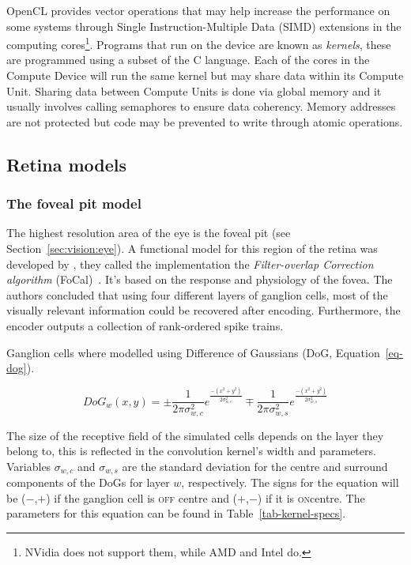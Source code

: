 OpenCL provides vector operations that may help increase the performance on some systems through Single Instruction-Multiple Data (SIMD) extensions in the computing cores\footnote{NVidia does not support them, while AMD and Intel do.}. Programs that run on the device are known as \emph{kernels}, these are programmed using a subset of the C language. Each of the cores in the Compute Device will run the same kernel but may share data within its Compute Unit. Sharing data between Compute Units is done via global memory and it usually involves calling semaphores to ensure data coherency. Memory addresses are not protected but code may be prevented to write through atomic operations.

\subsection{Retina models}
\subsubsection{The foveal pit model}

The highest resolution area of the eye is the foveal pit (see Section~\ref{sec:vision:eye}). A functional model for this region of the retina was developed by \citeauthor{basab-model}, they called the implementation the \emph{Filter-overlap Correction algorithm} (FoCal)~\cite{basab-model}. It's based on the response and physiology of the fovea. The authors concluded that using four different layers of ganglion cells, most of the visually relevant information could be recovered after encoding. Furthermore, the encoder outputs a collection of rank-ordered spike trains. 

Ganglion cells where modelled using Difference of Gaussians (DoG, Equation~\ref{eq-dog}). 

\begin{equation}
\label{eq-dog}
DoG_w(x,y) = \pm\frac{1}{2\pi\sigma_{w,c}^2}e^{\frac{-(x^2 + y^2)}{2\sigma_{w,c}^2}}
\mp\frac{1}{2\pi\sigma_{w,s}^2}e^{\frac{-(x^2 + y^2)}{2\sigma_{w,s}^2}}
\end{equation}

The size of the receptive field of the simulated cells depends on the layer they belong to, this is reflected in the convolution kernel's width and parameters. Variables $\sigma_{w,c}$ and $\sigma_{w,s}$ are the standard deviation for the centre and surround components of the DoGs for layer $w$, respectively. The signs for the equation will be ($-$,$+$) if the ganglion cell is \textsc{off} centre and ($+$,$-$) if it is \textsc{on}centre. The parameters for this equation can be found in Table~\ref{tab-kernel-specs}.

